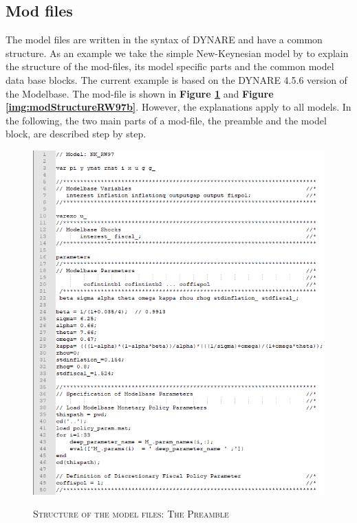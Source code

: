 \subsection*{Mod files}
The model files are written in the syntax of DYNARE and have a common structure.
As an example we take the simple New-Keynesian model by \cite{RotembergWoodford1997} to
explain the structure of the mod-files, its model specific parts and the common model data base blocks. The current example is based on the DYNARE 4.5.6 version of the Modelbase. The mod-file is shown in {\bf Figure \ref{img:modStructureRW97a}} and {\bf Figure \ref{img:modStructureRW97b}}. However, the explanations apply to all models.
In the following, the two main parts of a mod-file, the preamble and the model block, are described step by step.

\begin{figure}[p]
\centering
\caption{\textsc{Structure of the model files: The Preamble}}
\vspace{0.2cm}
\includegraphics[width=15cm,keepaspectratio]{mod1.png}\\
\label{img:modStructureRW97a}
\end{figure}

